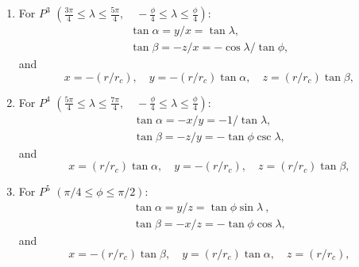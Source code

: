 \documentclass{report}
\begin{document}
\begin{enumerate}
\item For $P^3$ $\left(\frac{3\pi}{4} \leq \lambda \leq  \frac{5\pi}{4}, \quad -\frac{\phi}{4} \leq \lambda \leq  \frac{\phi}{4} \right)$:
\begin{equation} \label{e:P3-sphere-to-cube}
    \begin{array}{l}
        \tan\alpha =  y/x =  \tan \lambda ,\\
        \tan\beta = -z/x = -  \cos \lambda / \tan \phi  ,
    \end{array}
\end{equation}
and
\begin{equation}
            x = -(r/r_c),  \quad
        y = -(r/r_c) \tan\alpha,\quad
        z = (r/r_c) \tan\beta,
\end{equation}

\item For $P^4$ $\left(\frac{5\pi}{4} \leq \lambda \leq  \frac{7\pi}{4}, \quad -\frac{\phi}{4} \leq \lambda \leq  \frac{\phi}{4} \right)$:
\begin{equation} \label{e:P4-sphere-to-cube}
    \begin{array}{l}
        \tan\alpha = - x/y = -1 / \tan \lambda ,\\
        \tan\beta = - z/y = -\tan \phi \csc \lambda  ,
    \end{array}
\end{equation}
and
\begin{equation}
            x = (r/r_c) \tan\alpha,  \quad
        y = -(r/r_c),\quad
        z = (r/r_c) \tan\beta,
\end{equation}
\item For $P^5$ $\left(\pi/4 \leq \phi \leq \pi/2 \right)$:
\begin{equation} \label{e:P5-sphere-to-cube}
    \begin{array}{l}
        \tan\alpha =   y/z = \tan \phi \sin \lambda \ ,\\
        \tan\beta = - x/z = - \tan \phi \cos \lambda , 
    \end{array}
\end{equation}
and
\begin{equation}
            x = - (r/r_c) \tan\beta,  \quad
        y = (r/r_c) \tan\alpha,\quad
        z = (r/r_c),
\end{equation}


\end{enumerate}
\end{document}
